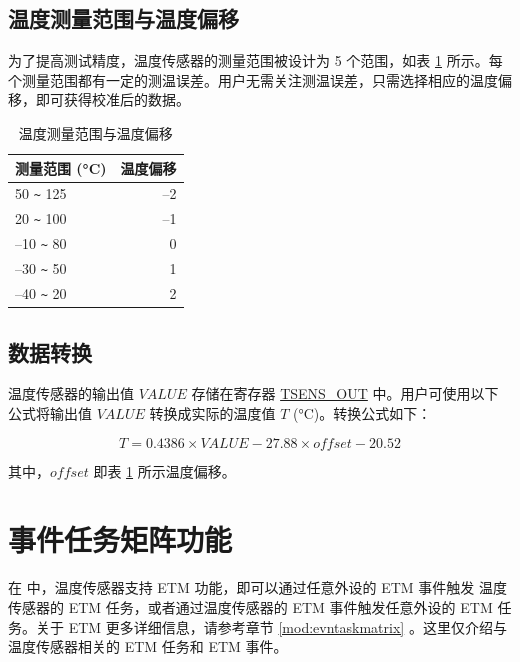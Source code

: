 \documentclass[main\_\_CN.tex]{subfiles}
\begin{document}
\subsection{温度测量范围与温度偏移}

为了提高测试精度，温度传感器的测量范围被设计为 5 个范围，如表 \ref{tab:tsensor-dac} 所示。每个测量范围都有一定的测温误差。用户无需关注测温误差，只需选择相应的温度偏移，即可获得校准后的数据。

\begin{longtable}[c]{|l|r|}
    \caption{温度测量范围与温度偏移}
    \label{tab:tsensor-dac}
    \\\hline
    \rowcolor{lightgray}
    \textbf{测量范围 (°C)}  & \textbf{温度偏移} \\\hline
    50 \verb+~+ 125 & –2 \\\hline
    20 \verb+~+ 100 &  –1 \\\hline
    –10 \verb+~+ 80 &  0 \\\hline
    –30 \verb+~+ 50 &  1 \\\hline
    –40 \verb+~+ 20 &  2 \\\hline
\end{longtable}

\subsection{数据转换}

温度传感器的输出值 \(VALUE\) 存储在寄存器 \hyperref[fielddesc:TSENSOUT]{TSENS\_OUT} 中。用户可使用以下公式将输出值 \(VALUE\) 转换成实际的温度值 \(T\) (°C)。转换公式如下：

\[
        T = 0.4386 \times VALUE - 27.88 \times offset - 20.52
\]

其中，\(offset\) 即表 \ref{tab:tsensor-dac} 所示温度偏移。


\section{事件任务矩阵功能}
\label{sec:sensor-etm-func}

在 \chipname{} 中，温度传感器支持 ETM 功能，即可以通过任意外设的 ETM 事件触发 温度传感器的 ETM 任务，或者通过温度传感器的 ETM 事件触发任意外设的 ETM 任务。关于 ETM 更多详细信息，请参考章节 \ref{mod:evntaskmatrix} 。这里仅介绍与温度传感器相关的 ETM 任务和 ETM 事件。
\end{document}

